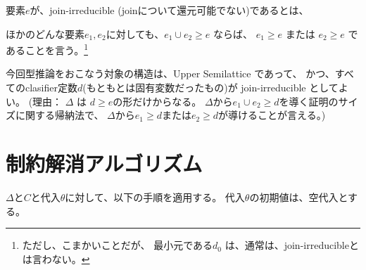\documentclass[dvipdfmx]{jsarticle}
\begin{document}
要素$e$が、join-irreducible (joinについて還元可能でない)であるとは、

ほかのどんな要素$e_1,e_2$に対しても、$e_1 \cup e_2 \ge e$ ならば、
$e_1 \ge e$ または
$e_2 \ge e$ であることを言う。\footnote{ただし、こまかいことだが、
  最小元である$d_0$ は、通常は、join-irreducibleとは言わない。}

今回型推論をおこなう対象の構造は、Upper Semilattice であって、
かつ、すべてのclasifier定数$d$(もともとは固有変数だったもの)が
join-irreducible としてよい。
(理由： $\Delta$ は $d\ge e$の形だけからなる。
$\Delta$から$e_1 \cup e_2 \ge d$を導く証明のサイズに関する帰納法で、
$\Delta$から$e_1 \ge d$または$e_2 \ge d$が導けることが言える。)

\section{制約解消アルゴリズム}

$\Delta$と$C$と代入$\theta$に対して、以下の手順を適用する。
代入$\theta$の初期値は、空代入とする。
\end{document}
